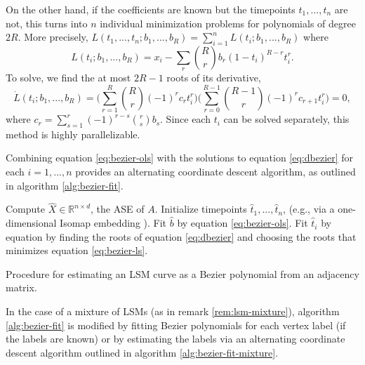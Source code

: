 \documentclass[12pt]{article}
\begin{document}
On the other hand, if the coefficients are known but the timepoints
\(t_1, ..., t_n\) are not, this turns into \(n\) individual minimization
problems for polynomials of degree \(2 R\). More precisely,
\(L(t_1, ..., t_n; b_1, ..., b_R) = \sum_{i=1}^n L(t_i; b_1, ..., b_R)\)
where \begin{equation}
\label{eq:bezier-ls}
L(t_i; b_1, ..., b_R) = x_i - \sum_r \binom{R}{r} b_r (1-t_i)^{R-r} t_i^r. 
\end{equation} To solve, we find the at most \(2 R - 1\) roots of its
derivative, \begin{equation}
\label{eq:dbezier}
\dot{L}(t_i; b_1, ..., b_R) = \bigg(\sum_{r=1}^R \binom{R}{r} (-1)^r c_r t_i^r \bigg) \bigg(\sum_{r=0}^{R-1} \binom{R-1}{r} (-1)^r c_{r+1} t_i^r \bigg) = 0,
\end{equation} where \(c_r = \sum_{s=1}^r (-1)^{r-s} \binom{r}{s} b_s\).
Since each \(t_i\) can be solved separately, this method is highly
parallelizable.

Combining equation \ref{eq:bezier-ols} with the solutions to equation
\ref{eq:dbezier} for each \(i = 1, ..., n\) provides an alternating
coordinate descent algorithm, as outlined in algorithm
\ref{alg:bezier-fit}.

\begin{algorithm}[h]
\label{alg:bezier-fit}
\DontPrintSemicolon
\SetAlgoLined
{}
Compute $\hat{X} \in \mathbb{R}^{n \times d}$, the ASE of $A$.\;
Initialize timepoints $\hat{t}_1, ..., \hat{t}_n$, (e.g., via a one-dimensional Isomap embedding \citep{Tenenbaum2000-ff}).\;
 {
  Fit $\hat{b}$ by equation \ref{eq:bezier-ols}.\;
   {
    Fit $\hat{t}_i$ by equation by finding the roots of equation \ref{eq:dbezier} and choosing the roots that minimizes equation \ref{eq:bezier-ls}.\;
  }
}
\caption{Procedure for estimating an LSM curve as a Bezier polynomial from an adjacency matrix.}
\end{algorithm}

In the case of a mixture of LSMs (as in remark \ref{rem:lsm-mixture}),
algorithm \ref{alg:bezier-fit} is modified by fitting Bezier polynomials
for each vertex label (if the labels are known) or by estimating the
labels via an alternating coordinate descent algorithm outlined in
algorithm \ref{alg:bezier-fit-mixture}.
\end{document}
